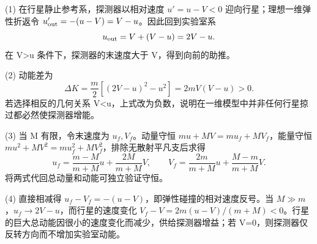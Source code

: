 (1) 在行星静止参考系，探测器以相对速度 \(u'=u-V<0\) 迎向行星；理想一维弹性折返令 \(u'_{\rm out}=-(u-V)=V-u\)。因此回到实验室系
\[
u_{\rm out}=V+(V-u)=2V-u.
\]
在 V>u 条件下，探测器的末速度大于 V，得到向前的助推。

(2) 动能差为
\[
\Delta K=\frac m2[(2V-u)^2-u^2]=2mV(V-u)>0.
\]
若选择相反的几何关系 V<u，上式改为负数，说明在一维模型中并非任何行星掠过都必然使探测器增能。

(3) 当 M 有限，令末速度为 \(u_f,V_f\)。动量守恒 \(mu+MV=mu_f+MV_f\)，能量守恒 \(mu^2+MV^2=mu_f^2+MV_f^2\)，排除无散射平凡支后求得
\[
u_f=\frac{m-M}{m+M}u+\frac{2M}{m+M}V,\qquad
V_f=\frac{2m}{m+M}u+\frac{M-m}{m+M}V.
\]
将两式代回总动量和动能可独立验证守恒。

(4) 直接相减得 \(u_f-V_f=-(u-V)\)，即弹性碰撞的相对速度反号。当 \(M\gg m\)，\(u_f\to2V-u\)，而行星的速度变化 \(V_f-V=2m(u-V)/(m+M)<0\)。行星的巨大总动能因很小的速度变化而减少，供给探测器增益；若 V=0，则探测器仅反转方向而不增加实验室动能。
